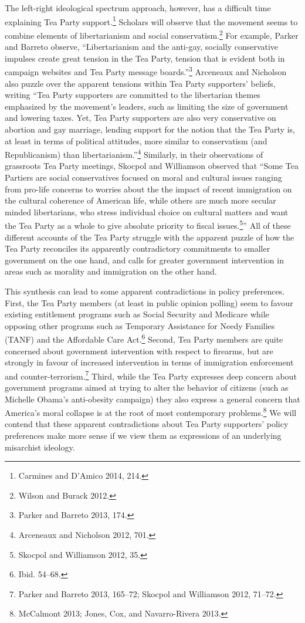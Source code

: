 \documentclass[12pt,]{article}
\begin{document}
The left-right ideological spectrum approach, however, has a difficult
time explaining Tea Party support.\footnote{Carmines and D'Amico 2014,
  214. } Scholars will observe that the movement seems to combine
elements of libertarianism and social conservatism.\footnote{Wilson and
  Burack 2012. } For example, Parker and Barreto observe,
``Libertarianism and the anti-gay, socially conservative impulses create
great tension in the Tea Party, tension that is evident both in campaign
websites and Tea Party message boards.''\footnote{Parker and Barreto
  2013, 174. } Arceneaux and Nicholson also puzzle over the apparent
tensions within Tea Party supporters' beliefs, writing ``Tea Party
supporters are committed to the libertarian themes emphasized by the
movement's leaders, such as limiting the size of government and lowering
taxes. Yet, Tea Party supporters are also very conservative on abortion
and gay marriage, lending support for the notion that the Tea Party is,
at least in terms of political attitudes, more similar to conservatism
(and Republicanism) than libertarianism.''\footnote{Arceneaux and
  Nicholson 2012, 701. } Similarly, in their observations of grassroots
Tea Party meetings, Skocpol and Williamson observed that ``Some Tea
Partiers are social conservatives focused on moral and cultural issues
ranging from pro-life concerns to worries about the the impact of recent
immigration on the cultural coherence of American life, while others are
much more secular minded libertarians, who stress individual choice on
cultural matters and want the Tea Party as a whole to give absolute
priority to fiscal issues.\footnote{Skocpol and Williamson 2012, 35. }''
All of these different accounts of the Tea Party struggle with the
apparent puzzle of how the Tea Party reconciles its apparently
contradictory commitments to smaller government on the one hand, and
calls for greater government intervention in areas such as morality and
immigration on the other hand.

This synthesis can lead to some apparent contradictions in policy
preferences. First, the Tea Party members (at least in public opinion
polling) seem to favour existing entitlement programs such as Social
Security and Medicare while opposing other programs such as Temporary
Assistance for Needy Families (TANF) and the Affordable Care
Act.\footnote{Ibid. 54--68. } Second, Tea Party members are quite
concerned about government intervention with respect to firearms, but
are strongly in favour of increased intervention in terms of immigration
enforcement and counter-terrorism.\footnote{Parker and Barreto 2013,
  165--72; Skocpol and Williamson 2012, 71--72. } Third, while the Tea
Party expresses deep concern about government programs aimed at trying
to alter the behavior of citizens (such as Michelle Obama's anti-obesity
campaign) they also express a general concern that America's moral
collapse is at the root of most contemporary problems.\footnote{McCalmont
  2013; Jones, Cox, and Navarro-Rivera 2013. } We will contend that
these apparent contradictions about Tea Party supporters' policy
preferences make more sense if we view them as expressions of an
underlying misarchist ideology.
\end{document}
